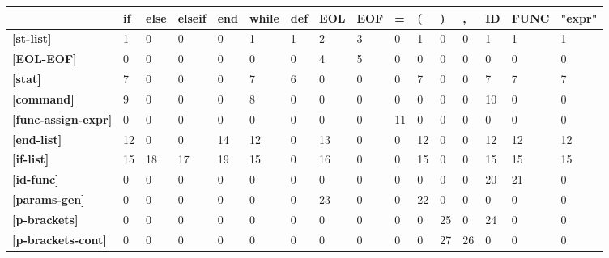 \documentclass[11pt, a4paper]{article}
\begin{document}
\newpage
\begin{table}[]
\setlength{\tabcolsep}{4pt}
\centering
{}
\begin{tabular}{l|l|l|l|l|l|l|l|l|l|l|l|l|l|l|l}
                       & \textbf{if} & \textbf{else} & \textbf{elseif} & \textbf{end} & \textbf{while} & \textbf{def} & \textbf{EOL} & \textbf{EOF} & \textbf{=}  & \textbf{(}  & \textbf{)}  & \textbf{,}  & \textbf{ID} & \textbf{FUNC} & \textbf{"expr"} \\\hline
\textbf{{[}st-list{]} }         & 1  & 0    & 0     & 0   & 1     & 1   & 2   & 3   & 0  & 1  & 0  & 0  & 1  & 1    & 1      \\\hline
\textbf{{[}EOL-EOF{]}}          & 0  & 0    & 0     & 0   & 0     & 0   & 4   & 5   & 0  & 0  & 0  & 0  & 0  & 0    & 0      \\\hline
\textbf{{[}stat{]}}             & 7  & 0    & 0     & 0   & 7     & 6   & 0   & 0   & 0  & 7  & 0  & 0  & 7  & 7    & 7      \\\hline
\textbf{{[}command{]} }         & 9  & 0    & 0     & 0   & 8     & 0   & 0   & 0   & 0  & 0  & 0  & 0  & 10 & 0    & 0      \\\hline
\textbf{{[}func-assign-expr{]}} & 0  & 0    & 0     & 0   & 0     & 0   & 0   & 0   & 11 & 0  & 0  & 0  & 0  & 0    & 0      \\\hline
\textbf{{[}end-list{]} }        & 12 & 0    & 0     & 14  & 12    & 0   & 13  & 0   & 0  & 12 & 0  & 0  & 12 & 12   & 12     \\\hline
\textbf{{[}if-list{]}}          & 15 & 18   & 17    & 19  & 15    & 0   & 16  & 0   & 0  & 15 & 0  & 0  & 15 & 15   & 15     \\\hline
\textbf{{[}id-func{]}}          & 0  & 0    & 0     & 0   & 0     & 0   & 0   & 0   & 0  & 0  & 0  & 0  & 20 & 21   & 0      \\\hline
\textbf{{[}params-gen{]}}       & 0  & 0    & 0     & 0   & 0     & 0   & 23  & 0   & 0  & 22 & 0  & 0  & 0  & 0    & 0      \\\hline
\textbf{{[}p-brackets{]}}       & 0  & 0    & 0     & 0   & 0     & 0   & 0   & 0   & 0  & 0  & 25 & 0  & 24 & 0    & 0      \\\hline
\textbf{{[}p-brackets-cont{]}}  & 0  & 0    & 0     & 0   & 0     & 0   & 0   & 0   & 0  & 0  & 27 & 26 & 0  & 0    & 0     
\end{tabular}
\end{table}
\end{document}
